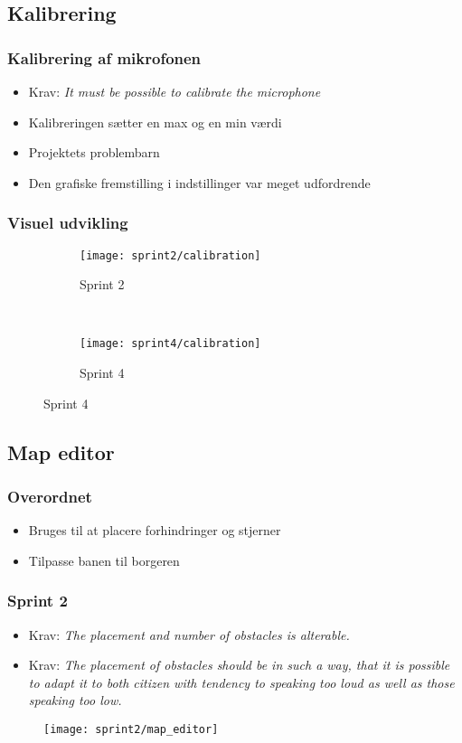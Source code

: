 \subsection{Kalibrering}
\begin{frame}
\frametitle{Kalibrering af mikrofonen}
\begin{itemize}
\item Krav: \textit{It must be possible to calibrate the microphone}
\item Kalibreringen sætter en max og en min værdi
\item Projektets problembarn
\item Den grafiske fremstilling i indstillinger var meget udfordrende
\end{itemize}
\end{frame}

\begin{frame}
\frametitle{Visuel udvikling}
\begin{figure}
\begin{subfigure}[b]{0.4\textwidth}
\texttt{[image: sprint2/calibration]}
\caption*{Sprint 2}
\end{subfigure}
~
\begin{subfigure}[b]{0.4\textwidth}
\texttt{[image: sprint4/calibration]}
\caption*{Sprint 4}
\end{subfigure}
\end{figure}
\end{frame}


\subsection{Map editor}
\begin{frame}
\frametitle{Overordnet}
\begin{itemize}
\item Bruges til at placere forhindringer og stjerner
\item Tilpasse banen til borgeren
\end{itemize}
\end{frame}
\begin{frame}
\frametitle{Sprint 2}
\begin{itemize}
\item Krav: \textit{The placement and number of obstacles is alterable.}
\item Krav: \textit{The placement of obstacles should be
in such a way,
that it is possible to adapt it to both citizen
with tendency to speaking too loud
as well as those speaking too low.}
\end{itemize}
\begin{figure}[h]
\texttt{[image: sprint2/map\_editor]}
\end{figure}
\end{frame}

